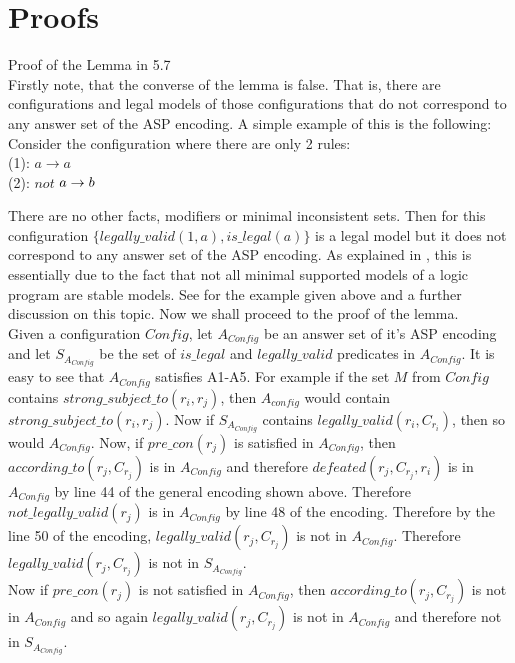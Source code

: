 \section{Proofs}\label{sec:proofs}

Proof of the Lemma in 5.7\\
Firstly note, that the converse of the lemma is false. That is, there are configurations and legal models of those configurations that do not correspond to any answer set of the ASP encoding. A simple example of this is the following: Consider the configuration where there are only 2 rules:\\ (1): $a\rightarrow a$\\
(2): $not$ $a\rightarrow b\\$

There are no other facts, modifiers or minimal inconsistent sets. Then for this configuration $\{legally\_valid(1,a), is\_legal(a)\}$ is a legal model but it does not correspond to any answer set of the ASP encoding. As explained in \cite{KRR_notes}, this is essentially due to the fact that not all minimal supported models of a logic program are stable models. See \cite{KRR_notes} for the example given above and a further discussion on this topic.  Now we shall proceed to the proof of the lemma.\\

Given a configuration $Config$, let $A_{Config}$ be an answer set of it's ASP encoding and let $S_{A_{Config}}$ be the set of $is\_legal$ and $legally\_valid$ predicates in $A_{Config}$. It is easy to see that $A_{Config}$ satisfies A1-A5. For example if the set $M$ from $Config$ contains $strong\_subject\_to(r_{i}, r_{j})$, then $A_{config}$ would contain $strong\_subject\_to(r_{i}, r_{j})$. Now if $S_{A_{Config}}$ contains $legally\_valid(r_{i}, C_{r_{i}})$, then so would $A_{Config}$. Now, if $pre\_con(r_{j})$ is satisfied in $A_{Config}$, then $according\_to(r_{j},C_{r_{j}})$ is in $A_{Config}$ and therefore $defeated(r_{j}, C_{r_{j}}, r_{i})$ is in $A_{Config}$ by line 44 of the general encoding shown above. Therefore $not\_legally\_valid(r_{j})$ is in $A_{Config}$ by line 48 of the encoding. Therefore by the line 50 of the encoding, $legally\_valid(r_{j},C_{r_{j}})$ is not in $A_{Config}$. Therefore $legally\_valid(r_{j},C_{r_{j}})$ is not in $S_{A_{Config}}$.\\

Now if $pre\_con(r_{j})$ is not satisfied in $A_{Config}$, then $according\_to(r_{j},C_{r_{j}})$ is not in $A_{Config}$ and so again $legally\_valid(r_{j},C_{r_{j}})$ is not in $A_{Config}$ and therefore not in $S_{A_{Config}}$.\\

